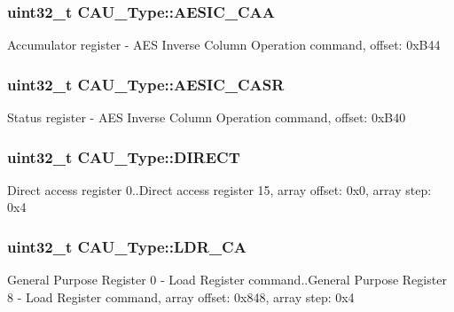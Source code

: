 \subsubsection[{\texorpdfstring{A\+E\+S\+I\+C\+\_\+\+C\+AA}{AESIC_CAA}}]{ uint32\+\_\+t C\+A\+U\+\_\+\+Type\+::\+A\+E\+S\+I\+C\+\_\+\+C\+AA}\hypertarget{structCAU__Type_ac3ab3c104b8e5125d1968d655f046dc6}{}\label{structCAU__Type_ac3ab3c104b8e5125d1968d655f046dc6}
Accumulator register -\/ A\+ES Inverse Column Operation command, offset\+: 0x\+B44 
\subsubsection[{\texorpdfstring{A\+E\+S\+I\+C\+\_\+\+C\+A\+SR}{AESIC_CASR}}]{ uint32\+\_\+t C\+A\+U\+\_\+\+Type\+::\+A\+E\+S\+I\+C\+\_\+\+C\+A\+SR}\hypertarget{structCAU__Type_a9fd9367f363d483b8b093c7ec5d43537}{}\label{structCAU__Type_a9fd9367f363d483b8b093c7ec5d43537}
Status register -\/ A\+ES Inverse Column Operation command, offset\+: 0x\+B40 
\subsubsection[{\texorpdfstring{D\+I\+R\+E\+CT}{DIRECT}}]{ uint32\+\_\+t C\+A\+U\+\_\+\+Type\+::\+D\+I\+R\+E\+CT}\hypertarget{structCAU__Type_ad414a622f9732f77f9ca2ebb787c842c}{}\label{structCAU__Type_ad414a622f9732f77f9ca2ebb787c842c}
Direct access register 0..Direct access register 15, array offset\+: 0x0, array step\+: 0x4 
\subsubsection[{\texorpdfstring{L\+D\+R\+\_\+\+CA}{LDR_CA}}]{ uint32\+\_\+t C\+A\+U\+\_\+\+Type\+::\+L\+D\+R\+\_\+\+CA}\hypertarget{structCAU__Type_a505ec0918825dd09570bb7fd6ab53df4}{}\label{structCAU__Type_a505ec0918825dd09570bb7fd6ab53df4}
General Purpose Register 0 -\/ Load Register command..General Purpose Register 8 -\/ Load Register command, array offset\+: 0x848, array step\+: 0x4 
